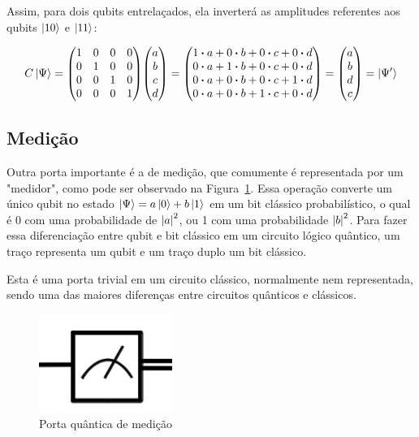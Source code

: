 \documentclass[a4paper, 12pt, oneside]{book}
\begin{document}
Assim, para dois qubits entrelaçados, ela inverterá as amplitudes referentes aos qubits $\ket{10}$ e $\ket{11}$:

\begin{equation}\label{eqFullCNOT}
C\ket{\Psi} = \mqty(1&0&0&0\\0&1&0&0\\0&0&1&0\\0&0&0&1)\mqty(a\\b\\c\\d) = 
\mqty(1 \vdot a+0 \vdot b +0 \vdot c +0 \vdot d \\
	  0 \vdot a+1 \vdot b +0 \vdot c +0 \vdot d \\
	  0 \vdot a+0 \vdot b +0 \vdot c +1 \vdot d \\
	  0 \vdot a+0 \vdot b +1 \vdot c +0 \vdot d ) 
= \mqty(a\\b\\d\\c) = \ket{\Psi'}
\end{equation}

\subsection{Medição} \label{sec:medicao}
Outra porta importante é a de medição, que comumente é representada por um "medidor", como pode ser observado na Figura~\ref{fig:medicao}. Essa operação converte um único qubit no estado $\ket{\Psi}=a\ket{0}+b\ket{1}$ em um bit clássico probabilístico, o qual é 0 com uma probabilidade de $\abs{a}^2$, ou 1 com uma probabilidade $\abs{b}^2$. Para fazer essa diferenciação entre qubit e bit clássico em um circuito lógico quântico, um traço representa um qubit e um traço duplo um bit clássico.

Esta é uma porta trivial em um circuito clássico, normalmente nem representada, sendo uma das maiores diferenças entre circuitos quânticos e clássicos.


\begin{figure}[H]
\centering
\includegraphics[scale=0.40]{medicao.png}
\caption{Porta quântica de medição}
\label{fig:medicao}
\end{figure}
\end{document}
